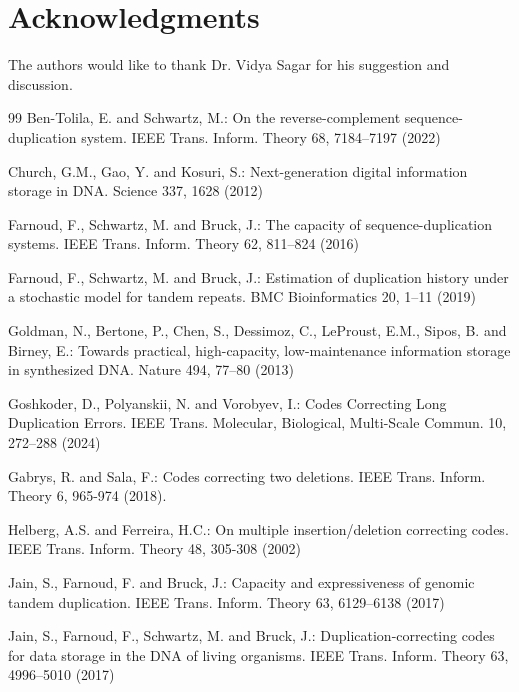 \documentclass[pdflatex,sn-mathphys-num]{sn-jnl}
\theoremstyle{theorem}%
\theoremstyle{definition}
\theoremstyle{construction}
\newtheorem{open problem}{Open problem}
\begin{document}
	\section*{Acknowledgments}
The authors would like to thank Dr. Vidya Sagar for his suggestion and discussion.
	\begin{thebibliography}{99}
		Ben-Tolila, E. and Schwartz, M.: 
		On the reverse-complement sequence-duplication system. 
		IEEE Trans. Inform. Theory 68, 7184–7197 (2022)
		
		Church, G.M., Gao, Y. and Kosuri, S.:  
		Next-generation digital information storage in DNA. 
		Science 337, 1628 (2012)
		

		
		Farnoud, F., Schwartz, M. and Bruck, J.: 
		The capacity of sequence-duplication systems. 
		IEEE Trans. Inform. Theory 62, 811–824 (2016)
		
		Farnoud, F., Schwartz, M. and Bruck, J.: 
		Estimation of duplication history under a stochastic model for tandem repeats. 
		BMC Bioinformatics 20, 1–11 (2019)
		
		Goldman, N., Bertone, P., Chen, S., Dessimoz, C., LeProust, E.M., Sipos, B. and Birney, E.: 
		Towards practical, high-capacity, low-maintenance information storage in synthesized DNA. 
		Nature 494, 77–80 (2013)
		
		Goshkoder, D., Polyanskii, N. and Vorobyev, I.: 
		Codes Correcting Long Duplication Errors. 
		IEEE Trans. Molecular, Biological, Multi-Scale Commun. 10, 272–288 (2024)
		
		Gabrys, R. and Sala, F.: Codes correcting two deletions. IEEE Trans. Inform. Theory 6, 965-974 (2018).
		
		Helberg, A.S. and Ferreira, H.C.: On multiple insertion/deletion correcting codes. IEEE Trans. Inform. Theory 48, 305-308 (2002)
		
		Jain, S., Farnoud, F. and Bruck, J.: 
		Capacity and expressiveness of genomic tandem duplication. 
		IEEE Trans. Inform. Theory 63, 6129–6138 (2017)
		
		Jain, S., Farnoud, F., Schwartz, M. and Bruck, J.: 
		Duplication-correcting codes for data storage in the DNA of living organisms. 
		IEEE Trans. Inform. Theory 63, 4996–5010 (2017)
		

\end{thebibliography}
\end{document}
